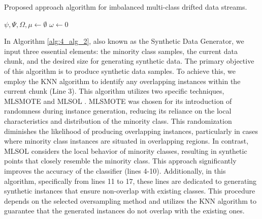 \begin{algorithm}[H]
\caption{Proposed approach algorithm for imbalanced multi-class drifted data streams.}
\label{alg:4_alg_1}
\BlankLine
$\psi, \Psi, \Omega, \mu \gets \emptyset$\;
$\omega \gets 0$\;
\end{algorithm}

\vspace{1cm}

In Algorithm \ref{alg:4_alg_2}, also known as the Synthetic Data Generator, we input three essential elements: the minority class samples, the current data chunk, and the desired size for generating synthetic data. The primary objective of this algorithm is to produce synthetic data samples. To achieve this, we employ the KNN algorithm to identify any overlapping instances within the current chunk (Line 3). This algorithm utilizes two specific techniques, MLSMOTE \cite{gama2004learning} and MLSOL \cite{liu2017regional}. MLSMOTE was chosen for its introduction of randomness during instance generation, reducing its reliance on the local characteristics and distribution of the minority class. This randomization diminishes the likelihood of producing overlapping instances, particularly in cases where minority class instances are situated in overlapping regions. In contrast, MLSOL considers the local behavior of minority classes, resulting in synthetic points that closely resemble the minority class. This approach significantly improves the accuracy of the classifier (lines 4-10). Additionally, in this algorithm, specifically from lines 11 to 17, these lines are dedicated to generating synthetic instances that ensure non-overlap with existing classes. This procedure depends on the selected oversampling method and utilizes the KNN algorithm to guarantee that the generated instances do not overlap with the existing ones.
\vspace{1cm}


